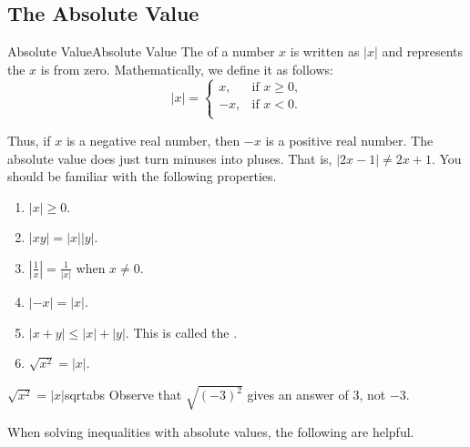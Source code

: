 \subsection{The Absolute Value}

\begin{definition}{Absolute Value}{Absolute Value}
	\label{def:AbsoluteValue}
The  of a number $x$ is written as $|x|$ and represents 
the  $x$ is from zero. Mathematically, we define it as follows:
$$|x|=\left\{\begin{array}{cl}
x, & \mbox{if $x\geq 0$,}\\
-x, & \mbox{if $x<0$.}\\
\end{array}\right.$$
\end{definition}

Thus, if $x$ is a negative real number, then $-x$ is a positive real number.
The absolute value does  just turn minuses into pluses.
That is, $|2x-1|\neq 2x+1$.
You should be familiar with the following properties.\\

\begin{formulabox}
\begin{enumerate}
	\item $|x|\geq 0$.
	\item $|xy|=|x||y|$.
	\item $\displaystyle{\left|\frac{1}{x} \right|=\frac{1}{|x|} }$ \hspace{2mm} when $x\neq 0$.
	\item $|-x|=|x|$.
	\item $|x+y|\leq |x|+|y|$. This is called the .
	\item $\sqrt{x^2}=|x|$.
\end{enumerate}
\end{formulabox}

\begin{example}{$\sqrt{x^2}=|x|$}{sqrtabs}
Observe that $\sqrt{(-3)^2}$ gives an answer of $3$, not $-3$.
\end{example}

When solving inequalities with absolute values, the following are helpful. %
%
 
